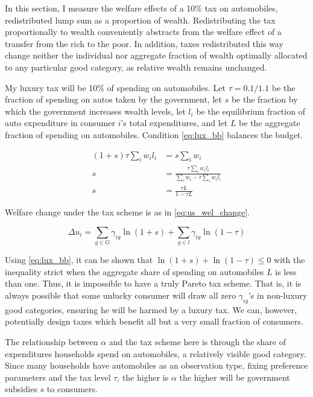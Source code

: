 \documentclass[12pt]{article}
\begin{document}
In this section, I measure the welfare effects of a 10\% tax on automobiles, redistributed lump sum as a proportion of wealth.  Redistributing the tax proportionally to wealth conveniently abstracts from the welfare effect of a transfer from the rich to the poor.  In addition, taxes redistributed this way change neither the individual nor aggregate fraction of wealth optimally allocated to any particular good category, as relative wealth remains unchanged.

My luxury tax will be 10\% of spending on automobiles.  Let $\tau = 0.1 / 1.1$ be the fraction of spending on autos taken by the government, let $s$ be the fraction by which the government increases wealth levels, let $l_i$ be the equilibrium fraction of auto expenditure in consumer $i$'s total expenditures, and let $L$ be the aggregate fraction of spending on automobiles.  Condition \eqref{eq:lux_bb} balances the budget.

\begin{align}
    (1 + s) \tau \sum_i w_i l_i &= s \sum_i w_i \nonumber \\
    s &= \frac{\tau \sum_i w_i l_i}{\sum_i w_i - \tau \sum_i w_i l_i} \nonumber \\
    \label{eq:lux_bb}
    s &= \frac{\tau L}{1 - \tau L}
\end{align}

Welfare change under the tax scheme is as in \eqref{eq:us_wel_change}.

\begin{equation}
    \label{eq:us_wel_change}
    \Delta u_i = \sum_{g\in G} \gamma_{ig} \ln(1 + s) + \sum_{g\in l} \gamma_{ig} \ln (1 - \tau)
\end{equation}

Using \eqref{eq:lux_bb}, it can be shown that $\ln(1+s) + \ln(1 - \tau) \leq 0$ with the inequality strict when the aggregate share of spending on automobiles $L$ is less than one.  Thus, it is impossible to have a truly Pareto tax scheme.  That is, it is always possible that some unlucky consumer will draw all zero $\gamma_{ig}$'s in non-luxury good categories, ensuring he will be harmed by a luxury tax.  We can, however, potentially design taxes which benefit all but a very small fraction of consumers.

The relationship between $\alpha$ and the tax scheme here is through the share of expenditures households spend on automobiles, a relatively visible good category.  Since many households have automobiles as an observation type, fixing preference parameters and the tax level $\tau$, the higher is $\alpha$ the higher will be government subsidies $s$ to consumers.
\end{document}
